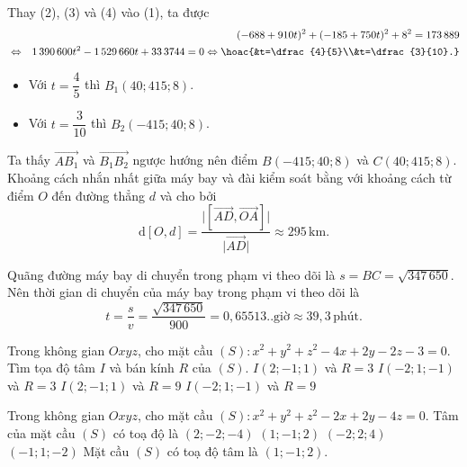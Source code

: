 \begin{ex}
{\begin{itemchoice}
		Thay (2), (3) và (4) vào (1), ta được
		\allowdisplaybreaks
		\begin{eqnarray*}
			&&(-688+910t)^2+(-185+750t)^2+8^2=173\,889\\ &\Leftrightarrow&1\,390\,600t^2-1\,529\,660t+33\,3744=0
			\Leftrightarrow\hoac{&t=\dfrac{4}{5}\\&t=\dfrac{3}{10}.}
		\end{eqnarray*}
		\begin{itemize}
			\item Với $t=\dfrac{4}{5}$ thì $B_1(40;415;8)$.
			\item  Với $t=\dfrac{3}{10}$ thì $B_2(-415;40;8)$.
		\end{itemize}
		Ta thấy $\overrightarrow{AB_1}$ và $\overrightarrow{B_1B_2}$ ngược hướng nên điểm $B(-415;40;8)$ và $C(40;415;8)$.
		\itemch Khoảng cách nhắn nhất giữa máy bay và đài kiểm soát bằng với khoảng cách từ điểm $O$ đến đường thẳng $d$ và cho bởi
		\[\mathrm{d}[O,d]=\dfrac{\big|\left[\overrightarrow{AD},\overrightarrow{OA}\right]\big|}{\big|\overrightarrow{AD}\big|}\approx 295 \,\text{km}.\]
		
		\itemch Quãng đường máy bay di chuyển trong phạm vi theo dõi là $s=BC=\sqrt{347\,650}$.\\ Nên thời gian di chuyển của máy bay trong phạm vi theo dõi là\\ $$t=\dfrac{s}{v}=\dfrac{\sqrt{347\,650}}{900}=0{,}65513.. \text{giờ}  \approx39{,}3 \,\text{phút}.$$
	\end{itemchoice}
	}
\end{ex}

\begin{ex}%
	Trong không gian $Oxy	z$, cho mặt cầu $(S)\colon x^2 + y^2 + z^2 - 4x + 2y - 2z - 3 = 0$. Tìm tọa độ tâm $I$ và bán kính $R$ của $(S)$.
	\choice
	{\True $I(2; -1; 1)$ và $R = 3$}
	{$I(-2; 1; -1)$ và $R = 3$}
	{$I(2; -1; 1)$ và $R = 9$}
	{$I(-2; 1; -1)$ và $R = 9$}
\end{ex}

\begin{ex}%
	Trong không gian $Oxyz$, cho mặt cầu $\left(S \right) \colon x^2 + y^2 + z^2 - 2x + 2y - 4z = 0$. Tâm của mặt cầu $\left(S \right)$ có toạ độ là
	\choice
	{$\left(2; -2; -4 \right)$}
	{\True $\left(1; -1; 2 \right)$}
	{$\left(-2; 2; 4\right)$}
	{$\left(-1; 1; -2 \right)$}
	\loigiai
	{Mặt cầu $\left(S \right)$ có toạ độ tâm là $\left(1; -1; 2 \right)$.
	}
\end{ex}

